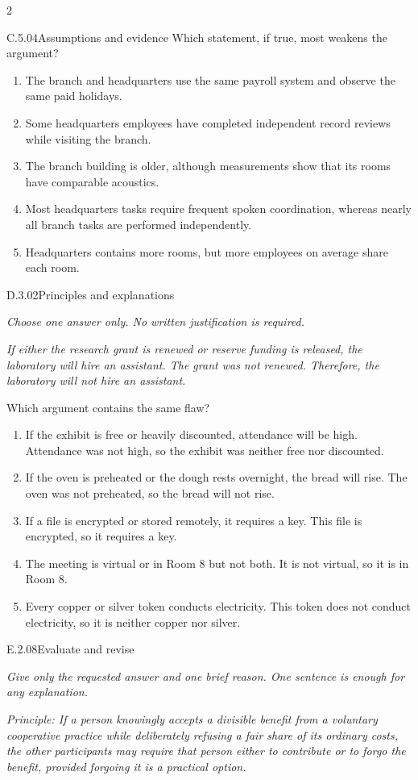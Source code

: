 \documentclass[9pt]{extarticle}
\newcommand{\choice}[1]{\item #1}
\begin{document}
\begin{multicols}{2}
\begin{DenseCoreProblem}{C.5.04}{Assumptions and evidence}
Which statement, if true, most weakens the argument?
\begin{enumerate}[label=(\alph*)]
  \choice{The branch and headquarters use the same payroll system and observe the same paid holidays.}
  \choice{Some headquarters employees have completed independent record reviews while visiting the branch.}
  \choice{The branch building is older, although measurements show that its rooms have comparable acoustics.}
  \choice{Most headquarters tasks require frequent spoken coordination, whereas nearly all branch tasks are performed independently.}
  \choice{Headquarters contains more rooms, but more employees on average share each room.}
\end{enumerate}
\end{DenseCoreProblem}
\begin{DenseCoreProblem}{D.3.02}{Principles and explanations}
{\scriptsize\textit{Choose one answer only. No written justification is required.}\par}
\emph{If either the research grant is renewed or reserve funding is released, the laboratory will hire an assistant. The grant was not renewed. Therefore, the laboratory will not hire an assistant.}

Which argument contains the same flaw?
\begin{enumerate}[label=(\alph*)]
  \choice{If the exhibit is free or heavily discounted, attendance will be high. Attendance was not high, so the exhibit was neither free nor discounted.}
  \choice{If the oven is preheated or the dough rests overnight, the bread will rise. The oven was not preheated, so the bread will not rise.}
  \choice{If a file is encrypted or stored remotely, it requires a key. This file is encrypted, so it requires a key.}
  \choice{The meeting is virtual or in Room 8 but not both. It is not virtual, so it is in Room 8.}
  \choice{Every copper or silver token conducts electricity. This token does not conduct electricity, so it is neither copper nor silver.}
\end{enumerate}
\end{DenseCoreProblem}
\begin{DenseCoreProblem}{E.2.08}{Evaluate and revise}
{\scriptsize\textit{Give only the requested answer and one brief reason. One sentence is enough for any explanation.}\par}
\emph{Principle: If a person knowingly accepts a divisible benefit from a voluntary cooperative practice while deliberately refusing a fair share of its ordinary costs, the other participants may require that person either to contribute or to forgo the benefit, provided forgoing it is a practical option.}


\end{DenseCoreProblem}
\end{multicols}
\end{document}

